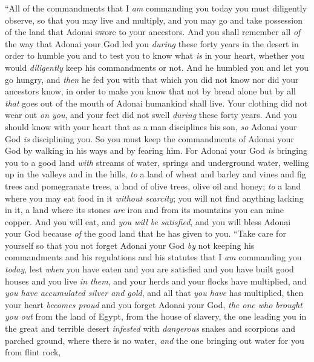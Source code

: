 \begin{biblechapter} %
\verse “All of the commandments that I \textit{am} commanding you today you must diligently observe, so that you may live and multiply, and you may go and take possession of the land that Adonai swore to your ancestors.
\verse And you shall remember all \textit{of} the way that Adonai your God led you \textit{during} these forty years in the desert in order to humble you and to test you to know what \textit{is} in your heart, whether you would \textit{diligently} keep his commandments or not.
\verse And he humbled you and let you go hungry, and \textit{then} he fed you with that which you did not know nor did your ancestors know, in order to make you know that not by bread alone but by all \textit{that} goes out of the mouth of Adonai humankind shall live.
\verse Your clothing did not wear out \textit{on you}, and your feet did not swell \textit{during} these forty years.
\verse And you should know with your heart that as a man disciplines his son, \textit{so} Adonai your God \textit{is} disciplining you.
\verse So you must keep the commandments of Adonai your God by walking in his ways and by fearing him.
\verse For Adonai your God \textit{is} bringing you to a good land \textit{with} streams of water, springs and underground water, welling up in the valleys and in the hills,
\verse \textit{to} a land of wheat and barley and vines and fig trees and pomegranate trees, a land of olive trees, olive oil and honey;
\verse \textit{to} a land where you may eat food in it \textit{without scarcity}; you will not find anything lacking in it, a land where its stones \textit{are} iron and from its mountains you can mine copper.
\verse And you will eat, and \textit{you will be satisfied}, and you will bless Adonai your God because \textit{of} the good land that he has given to you.
\verse “Take care for yourself so that you not forget Adonai your God \textit{by} not keeping his commandments and his regulations and his statutes that I \textit{am} commanding you \textit{today},
\verse lest \textit{when} you have eaten and you are satisfied and you have built good houses and you live \textit{in them},
\verse and your herds and your flocks have multiplied, and \textit{you have accumulated silver and gold}, and all that \textit{you have} has multiplied,
\verse then your heart \textit{becomes proud} and you forget Adonai your God, \textit{the one who brought you out} from the land of Egypt, from the house of slavery,
\verse the one leading you in the great and terrible desert \textit{infested} with \textit{dangerous} snakes and scorpions and parched ground, where there is no water, \textit{and} the one bringing out water for you from flint rock,

\end{biblechapter}
